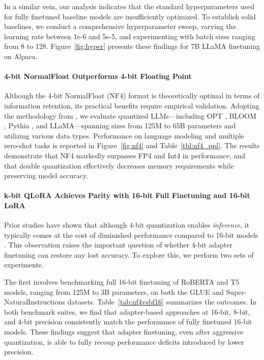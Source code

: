 In a similar vein, our analysis indicates that the standard hyperparameters used for fully finetuned baseline models are insufficiently optimized. To establish solid baselines, we conduct a comprehensive hyperparameter sweep, varying the learning rate between 1e-6 and 5e-5, and experimenting with batch sizes ranging from 8 to 128. Figure~\ref{fig:hyper} presents these findings for 7B LLaMA finetuning on Alpaca.

\paragraph{4-bit NormalFloat Outperforms 4-bit Floating Point}

Although the 4-bit NormalFloat (NF4) format is theoretically optimal in terms of information retention, its practical benefits require empirical validation. Adopting the methodology from \citet{dettmers2022case}, we evaluate quantized LLMs—including OPT \citep{zhang2022opt}, BLOOM \cite{scao2022bloom}, Pythia \cite{biderman2023pythia}, and LLaMA—spanning sizes from 125M to 65B parameters and utilizing various data types. Performance on language modeling and multiple zero-shot tasks is reported in Figure~\ref{fig:nf4} and Table~\ref{tbl:nf4_ppl}. The results demonstrate that NF4 markedly surpasses FP4 and Int4 in performance, and that double quantization effectively decreases memory requirements while preserving model accuracy.

\paragraph{k-bit \textsc{QLoRA} Achieves Parity with 16-bit Full Finetuning and 16-bit LoRA}

Prior studies have shown that although 4-bit quantization enables \emph{inference}, it typically comes at the cost of diminished performance compared to 16-bit models \citep{dettmers2022case,frantar2022gptq}. This observation raises the important question of whether 4-bit adapter finetuning can restore any lost accuracy. To explore this, we perform two sets of experiments.

The first involves benchmarking full 16-bit finetuning of RoBERTA and T5 models, ranging from 125M to 3B parameters, on both the GLUE and Super-NaturalInstructions datasets. Table~\ref{tab:nf4vsbf16} summarizes the outcomes. In both benchmark suites, we find that adapter-based approaches at 16-bit, 8-bit, and 4-bit precision consistently match the performance of fully finetuned 16-bit models. These findings suggest that adapter finetuning, even after aggressive quantization, is able to fully recoup performance deficits introduced by lower precision.

